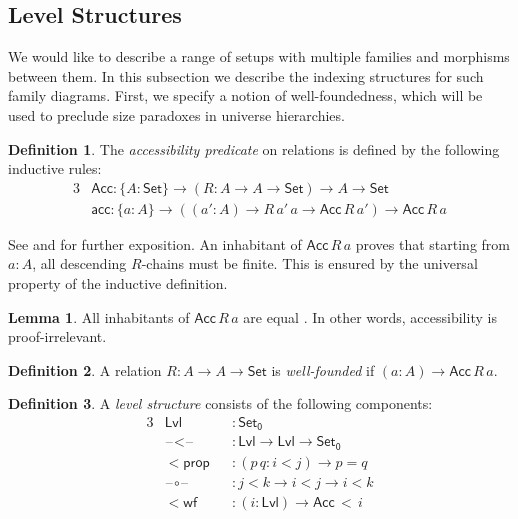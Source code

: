 \documentclass[a4paper,UKenglish,cleveref, autoref, thm-restate]{lipics-v2021}
\theoremstyle{remark}
\theoremstyle{definition}
\newtheorem{mydefinition}{Definition}
\newtheorem{mylemma}{Lemma}
\newcommand{\Set}[1]{\mathsf{Set_{#1}}}
\newcommand{\Seti}{\mathsf{Set}}
\newcommand{\blank}{\mathord{\hspace{1pt}\text{--}\hspace{1pt}}}
\newcommand{\mi}[1]{\mathit{#1}}
\newcommand{\Acc}{\mathsf{Acc}}
\newcommand{\acc}{\mathsf{acc}}
\newcommand{\Lvl}{\mathsf{Lvl}}
\begin{document}
\subsection{Level Structures}
\label{sec:level_structures}

We would like to describe a range of setups with multiple families and morphisms
between them. In this subsection we describe the indexing structures for such
family diagrams. First, we specify a notion of well-foundedness, which will be
used to preclude size paradoxes in universe hierarchies.

\begin{mydefinition}
The \emph{accessibility predicate} on relations is defined by the following
inductive rules:
\begin{alignat*}{3}
  & \Acc : \{A : \Seti\}\to(R : A \to A \to \Seti) \to A \to \Seti \\
  & \acc : \{a : A\} \to ((\mi{a'} : A) \to R\,\mi{a'}\,a \to \Acc\,R\,\mi{a'}) \to \Acc\,R\,a
\end{alignat*}
\end{mydefinition}
\noindent See \cite{aczel1977introduction} and \cite[Section~10.3]{hottbook} for
further exposition. An inhabitant of $\Acc\,R\,a$ proves that starting from $a :
A$, all descending $R$-chains must be finite. This is ensured by the universal
property of the inductive definition.

\begin{mylemma}\label{lem:accprop}
All inhabitants of $\Acc\,R\,a$ are equal \cite[Lemma 10.3.4]{hottbook}. In
other words, accessibility is proof-irrelevant.
\end{mylemma}

\begin{mydefinition}
A relation $R : A \to A \to \Seti$ is \emph{well-founded} if $(a : A) \to
\Acc\,R\,a$.
\end{mydefinition}

\begin{mydefinition} A \emph{level structure} consists of the following components:
\begin{alignat*}{3}
  & \Lvl                  &&: \Set0 \\
  & \blank\!<\!\blank     &&: \Lvl \to \Lvl \to \Set0 \\
  & \mathsf{<\!prop }     &&: (p\,q : i < j) \to p = q \\
  & \blank\!\circ\!\blank &&: j < k \to i < j \to i < k \\
  & \mathsf{<\!wf}        &&: (i : \Lvl) \to \Acc\,<\,i
\end{alignat*}
\end{mydefinition}
\end{document}
